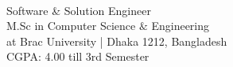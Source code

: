 
\begin{large}
    \\
\end{large}
Software \& Solution Engineer\\
M.Sc in Computer Science $\&$  Engineering\\
at Brac University | Dhaka 1212, Bangladesh \\
CGPA: 4.00 till 3rd Semester
\vspace{0.1cm}